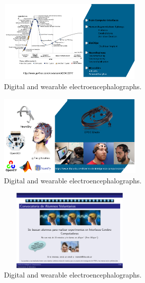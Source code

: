 \documentclass[aspectratio=169]{beamer}
\begin{document}
\begin{frame}   
\begin{figure}[]
\centering
\includegraphics[height=4cm,width=7cm]{images/hype.png}
\caption[Wearable portable Digital Electroencephalograph]{Digital and wearable electroencephalographs.}
\label{fig:digitalelectroencephalograph}
\end{figure}
\end{frame}

\begin{frame}   
\begin{figure}[]
\centering
\includegraphics[height=4cm,width=7cm]{images/Cic.png}
\caption[Wearable portable Digital Electroencephalograph]{Digital and wearable electroencephalographs.}
\label{fig:digitalelectroencephalograph}
\end{figure}
\end{frame}  

\begin{frame}   
\begin{figure}[]
\centering
\includegraphics[height=4cm,width=7cm]{images/Convocatoria.png}
\caption[Wearable portable Digital Electroencephalograph]{Digital and wearable electroencephalographs.}
\label{fig:digitalelectroencephalograph}
\end{figure}
\end{frame}  
\end{document}
